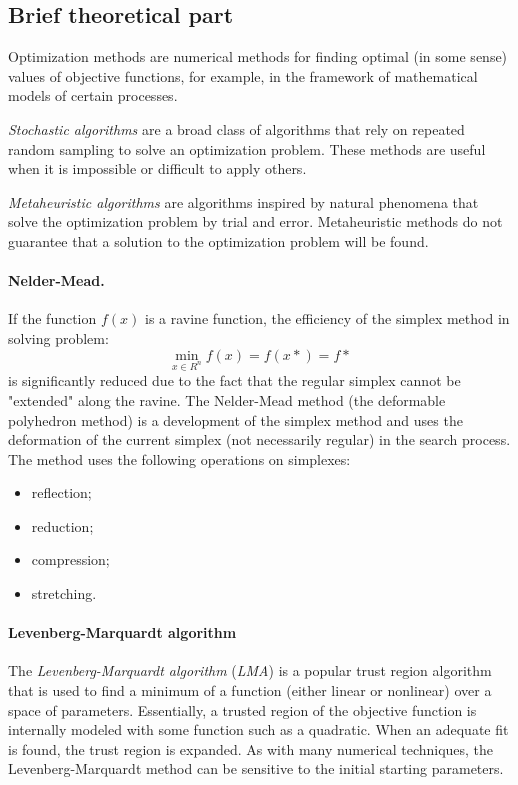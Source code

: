 \subsection{Brief theoretical part}\label{subsec:brief-theoretical-part}

Optimization methods are numerical methods for finding optimal (in some sense) values of objective functions, for example, in the framework of mathematical models of certain processes.

\textit{Stochastic algorithms} are a broad class of algorithms that rely on repeated random sampling to solve an optimization problem.
These methods are useful when it is impossible or difficult to apply others.

\textit{Metaheuristic algorithms} are algorithms inspired by natural phenomena that solve the optimization problem by trial and error.
Metaheuristic methods do not guarantee that a solution to the optimization problem will be found.

\paragraph{Nelder-Mead.}

If the function $f(x)$ is a ravine function, the efficiency of the simplex method in solving problem:
\begin{equation*}
    \min_{x \in R^n} f(x) = f(x*) = f*
\end{equation*}
is significantly reduced due to the fact that the regular simplex cannot be "extended" along the ravine.
The Nelder-Mead method (the deformable polyhedron method) is a development of the simplex method and uses the deformation of the current simplex (not necessarily regular) in the search process.
The method uses the following operations on simplexes:

\begin{itemize}
    \item reflection;
    \item reduction;
    \item compression;
    \item stretching.
\end{itemize}

\paragraph{Levenberg-Marquardt algorithm}

The \textit{Levenberg-Marquardt algorithm} (\textit{LMA}) is a popular trust region algorithm that is used to find a minimum of a function (either linear or nonlinear) over a space of parameters.
Essentially, a trusted region of the objective function is internally modeled with some function such as a quadratic.
When an adequate fit is found, the trust region is expanded.
As with many numerical techniques, the Levenberg-Marquardt method can be sensitive to the initial starting parameters.

